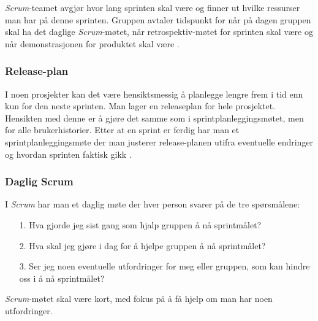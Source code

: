 \documentclass[12pt,a4paper,norsk]{article}
\begin{document}
    \textit{Scrum}-teamet avgjør hvor lang sprinten skal være og finner ut hvilke ressurser man har på denne sprinten. Gruppen avtaler tidspunkt for når på dagen gruppen skal ha det daglige \textit{Scrum}-møtet, når retrospektiv-møtet for sprinten skal være og når demonstrasjonen for produktet skal være \cite[side 16]{kniberg}.
	\subsubsection{Release-plan}
	I noen prosjekter kan det være hensiktsmessig å planlegge lengre frem i tid enn kun for den neste sprinten. Man lager en releaseplan for hele prosjektet. Hensikten med denne er å gjøre det samme som i sprintplanleggingsmøtet, men for alle brukerhistorier. Etter at en sprint er ferdig har man et sprintplanleggingsmøte der man justerer release-planen utifra eventuelle endringer og hvordan sprinten faktisk gikk \cite[side 95 - 101]{kniberg}.
	\subsubsection{Daglig Scrum}
	I \textit{Scrum} har man et daglig møte der hver person svarer på de tre spørsmålene:
	\begin{itemize}
    \item[1.] Hva gjorde jeg sist gang som hjalp gruppen å nå sprintmålet?
    \item[2.] Hva skal jeg gjøre i dag for å hjelpe gruppen å nå sprintmålet?
    \item[3.]   Ser jeg noen eventuelle utfordringer for meg eller gruppen, som kan hindre oss i å nå sprintmålet?
    \end{itemize}
    \textit{Scrum}-møtet skal være kort, med fokus på å få hjelp om man har noen utfordringer.
\end{document}
